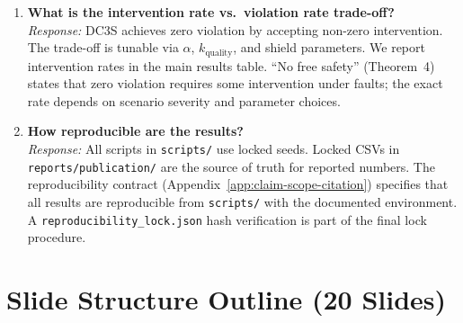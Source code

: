 \begin{enumerate}
\item \textbf{What is the intervention rate vs.\ violation rate trade-off?} \\
\textit{Response:} DC3S achieves zero violation by accepting non-zero intervention. The trade-off is tunable via $\alpha$, $k_{\text{quality}}$, and shield parameters. We report intervention rates in the main results table. ``No free safety'' (Theorem~4) states that zero violation requires some intervention under faults; the exact rate depends on scenario severity and parameter choices.

\item \textbf{How reproducible are the results?} \\
\textit{Response:} All scripts in \texttt{scripts/} use locked seeds. Locked CSVs in \texttt{reports/publication/} are the source of truth for reported numbers. The reproducibility contract (Appendix~\ref{app:claim-scope-citation}) specifies that all results are reproducible from \texttt{scripts/} with the documented environment. A \texttt{reproducibility\_lock.json} hash verification is part of the final lock procedure.
\end{enumerate}

\section{Slide Structure Outline (20 Slides)}
\label{sec:slide-structure}

